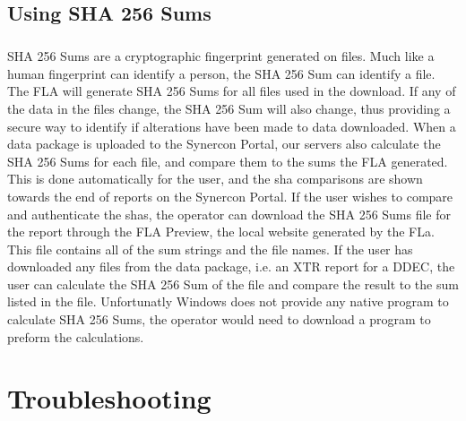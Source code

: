 \documentclass[11pt, oneside]{book}
\begin{document}
\section{Using SHA 256 Sums}
\label{subsec:using_shas}
\paragraph{  }
SHA 256 Sums are a cryptographic fingerprint generated on files. Much like a human fingerprint can identify a person, the SHA 256 Sum can identify a file. The FLA will generate SHA 256 Sums for all files used in the download. If any of the data in the files change, the SHA 256 Sum will also change, thus providing a secure way to identify if alterations have been made to data downloaded. When a data package is uploaded to the Synercon Portal, our servers also calculate the SHA 256 Sums for each file, and compare them to the sums the FLA generated. This is done automatically for the user, and the sha comparisons are shown towards the end of reports on the Synercon Portal. If the user wishes to compare and authenticate the shas, the operator can download the SHA 256 Sums file for the report through the FLA Preview, the local website generated by the FLa. This file contains all of the sum strings and the file names. If the user has downloaded any files from the data package, i.e. an XTR report for a DDEC, the user can calculate the SHA 256 Sum of the file and compare the result to the sum listed in the file. Unfortunatly Windows does not provide any native program to calculate SHA 256 Sums, the operator would need to download a program to preform the calculations.

\chapter{Troubleshooting}
\end{document}
